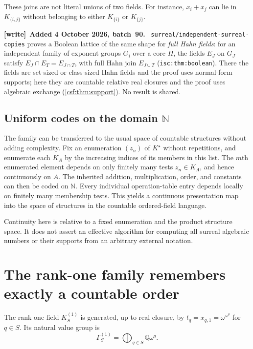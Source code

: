 \documentclass[11pt,a4paper]{article}
\numberwithin{equation}{section}
\theoremstyle{definition}
\theoremstyle{remark}
\newcommand{\N}{\mathbb N}
\newcommand{\Q}{\mathbb Q}
\newcommand{\Kstar}{K^{\star}}
\newcommand{\Kone}{K^{(1)}}
\newcommand{\repo}[1]{\nolinkurl{#1}}
\newcommand{\lbl}[1]{\nolinkurl{#1}}
\newenvironment{writenote}[1][]{\par\smallskip\begingroup\small\raggedright
 \setlength{\parindent}{1.25em}\noindent\textbf{[write]}\if\relax\detokenize{#1}\relax\else~\textbf{#1.}\fi\ }%
 {\par\endgroup\smallskip}
\begin{document}
These joins are not literal unions of two fields. For instance,
$x_i+x_j$ can lie in $K_{\{i,j\}}$ without belonging to either
$K_{\{i\}}$ or $K_{\{j\}}$.

\begin{writenote}[Added 4 October 2026, batch~90]
\repo{surreal/independent-surreal-copies} proves a Boolean lattice of the same shape for \emph{full Hahn fields}: for an independent family of exponent groups $G_i$ over a core $H$, the fields $E_J$ on $G_J$ satisfy $E_J\cap E_T=E_{J\cap T}$, with full Hahn join $E_{J\cup T}$ (\lbl{isc:thm:boolean}). There the fields are set-sized or class-sized Hahn fields and the proof uses normal-form supports; here they are countable relative real closures and the proof uses algebraic exchange (\cref{csf:thm:support}). No result is shared.
\end{writenote}

\subsection{Uniform codes on the domain \texorpdfstring{$\N$}{N}}

The family can be transferred to the usual space of countable structures
without adding complexity. Fix an enumeration $(z_n)$ of $\Kstar$ without
repetitions, and enumerate each $K_A$ by the increasing indices of its
members in this list. The $m$th enumerated element depends on only finitely
many tests $z_n\in K_A$, and hence continuously on $A$. The inherited
addition, multiplication, order, and constants can then be coded on $\N$.
Every individual operation-table entry depends locally on finitely many
membership tests. This yields a continuous presentation map into the
space of structures in the countable ordered-field language.

Continuity here is relative to a fixed enumeration and the product
structure space. It does not assert an effective algorithm for computing
all surreal algebraic numbers or their supports from an arbitrary external
notation.

\section{The rank-one family remembers exactly a countable order}
\label{csf:sec:rank-one}

The rank-one field $\Kone_S$ is generated, up to real closure, by
$t_q=x_{q,1}=\omega^{\omega^q}$ for $q\in S$. Its natural value group is
\begin{equation}
 \Gamma^{(1)}_S=\bigoplus_{q\in S}\Q\omega^q.
 \label{csf:eq:rank-one-values}
\end{equation}
\end{document}
